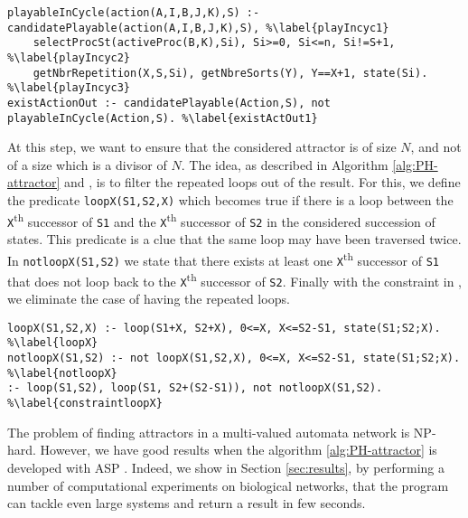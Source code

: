 \begin{lstlisting}
playableInCycle(action(A,I,B,J,K),S) :- candidatePlayable(action(A,I,B,J,K),S), %\label{playIncyc1}
	selectProcSt(activeProc(B,K),Si), Si>=0, Si<=n, Si!=S+1, %\label{playIncyc2}
	getNbrRepetition(X,S,Si), getNbreSorts(Y), Y==X+1, state(Si). %\label{playIncyc3}
existActionOut :- candidatePlayable(Action,S), not playableInCycle(Action,S). %\label{existActOut1}
\end{lstlisting}

At this step, we want to ensure that the considered attractor is of size $N$, and not of a size which is a divisor of $N$. The idea, as described in Algorithm \ref{alg:PH-attractor} and , is to filter the repeated loops out of the result. For this, we define the predicate \texttt{loopX(S1,S2,X)} which becomes true if there is a loop between the \texttt{X}\textsuperscript{th} successor of \texttt{S1} and the \texttt{X}\textsuperscript{th} successor of \texttt{S2} in the considered succession of states. This predicate is a clue that the same loop may have been traversed twice. In \texttt{notloopX(S1,S2)} we state that there exists at least one \texttt{X}\textsuperscript{th} successor of \texttt{S1} that does not loop back to the \texttt{X}\textsuperscript{th} successor of \texttt{S2}. Finally with the constraint in , we eliminate the case of having the repeated loops.

\begin{lstlisting}
loopX(S1,S2,X) :- loop(S1+X, S2+X), 0<=X, X<=S2-S1, state(S1;S2;X). %\label{loopX}
notloopX(S1,S2) :- not loopX(S1,S2,X), 0<=X, X<=S2-S1, state(S1;S2;X). %\label{notloopX}
:- loop(S1,S2), loop(S1, S2+(S2-S1)), not notloopX(S1,S2). %\label{constraintloopX}
\end{lstlisting}

The problem of finding attractors in a multi-valued automata network is NP-hard. However, we have good results when the algorithm \ref{alg:PH-attractor} is developed with ASP . Indeed, we show in Section \ref{sec:results}, by performing a number of computational experiments on biological networks, that the program can tackle even large systems and return a result in few seconds.

